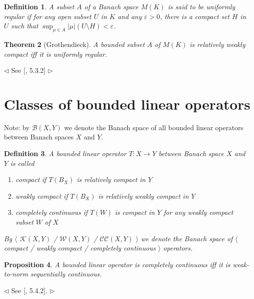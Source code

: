 \documentclass[12pt]{article}
\newtheorem{theorem}{Theorem}[section]
\newtheorem{proposition}[theorem]{Proposition}
\newtheorem{definition}[theorem]{Definition}
\newenvironment{proof}{\par $\triangleleft$}{$\triangleright$}
\begin{document}
\begin{definition} A subset $A$ of a Banach space $M(K)$ is said to be uniformly
    regular if for any open subset $U$ in $K$ and any $\varepsilon>0$, there is
    a compact set $H$ in $U$ such that $\sup_{\mu\in A}|\mu|(U\setminus
        H)<\varepsilon$.
\end{definition}

\begin{theorem}[Grothendieck] A bounded subset $A$ of $M(K)$ is relatively
    weakly compact iff it is uniformly regular.
\end{theorem}
\begin{proof} See [\cite{KalAlbTopicsBanSpTh}, 5.3.2]
\end{proof}

\section{Classes of bounded linear operators}

Note: by $\mathcal{B}(X,Y)$ we denote the Banach space of all bounded linear
operators between Banach spaces $X$ and $Y$.

\begin{definition} A bounded linear operator $T:X\to Y$ between Banach space $X$
    and $Y$ is called
    \begin{enumerate}[label = (\roman*)]
        \item compact if $T(B_X)$ is relatively compact in $Y$

        \item weakly compact if $T(B_X)$ is relatively weakly compact in $Y$

        \item completely continuous if $T(W)$ is compact in $Y$ for any weakly
              compact subset $W$ of $X$
    \end{enumerate}

    By $\langle$ $\mathcal{K}(X,Y)$ / $\mathcal{W}(X,Y)$ / $\mathcal{CC}(X,Y)$
    $\rangle$ we denote the Banach space of $\langle$ compact / weakly compact /
    completely continuous $\rangle$ operators.
\end{definition}

\begin{proposition} A bounded linear operator is completely continuous iff it is
    weak-to-norm sequentially  continuous.
\end{proposition}
\begin{proof} See [\cite{KalAlbTopicsBanSpTh}, 5.4.2].
\end{proof}
\end{document}
